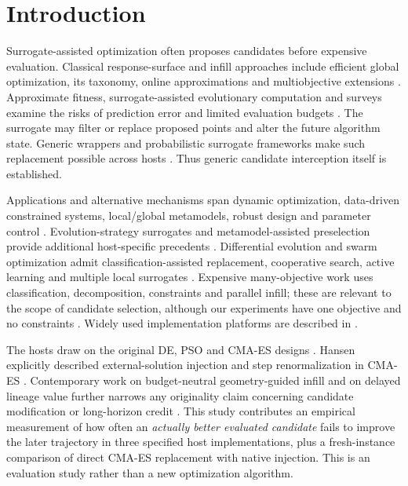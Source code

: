 \documentclass[10pt,letterpaper]{article}
\begin{document}
\clearpage
{}
\linenumbers

\section*{Introduction}
Surrogate-assisted optimization often proposes candidates before expensive evaluation. Classical response-surface and infill approaches include efficient global optimization, its taxonomy, online approximations and multiobjective extensions \cite{jones1998ego,jones2001,knowles2006,zhang2010}. Approximate fitness, surrogate-assisted evolutionary computation and surveys examine the risks of prediction error and limited evaluation budgets \cite{jin2002,jin2011survey,haftka2016,stork2020}. The surrogate may filter or replace proposed points and alter the future algorithm state. Generic wrappers and probabilistic surrogate frameworks make such replacement possible across hosts \cite{ong2003,lim2010,cai2020,blank2021psaf,gpsaf2022}. Thus generic candidate interception itself is established.

Applications and alternative mechanisms span dynamic optimization, data-driven constrained systems, local/global metamodels, robust design and parameter control \cite{luo2019,wang2020forest,zhou2007,ong2006,bagheri2017}. Evolution-strategy surrogates and metamodel-assisted preselection provide additional host-specific precedents \cite{emmerich2002,hansen2019surrogate}. Differential evolution and swarm optimization admit classification-assisted replacement, cooperative search, active learning and multiple local surrogates \cite{lu2011,wang2019de,sun2017pso,lv2019,wang2017committee,li2021}. Expensive many-objective work uses classification, decomposition, constraints and parallel infill; these are relevant to the scope of candidate selection, although our experiments have one objective and no constraints \cite{habib2019,pan2019,deb2019taxonomy,viana2010,beaucaire2019,berveglieri2020,bagheri2017constraint}. Widely used implementation platforms are described in \cite{blank2020pymoo,tian2017}.

The hosts draw on the original DE, PSO and CMA-ES designs \cite{storn1997,kennedy1995,hansen2001}. Hansen explicitly described external-solution injection and step renormalization in CMA-ES \cite{hansen2011inject}. Contemporary work on budget-neutral geometry-guided infill and on delayed lineage value further narrows any originality claim concerning candidate modification or long-horizon credit \cite{yu2026janus,siper2026}. This study contributes an empirical measurement of how often an \emph{actually better evaluated candidate} fails to improve the later trajectory in three specified host implementations, plus a fresh-instance comparison of direct CMA-ES replacement with native injection. This is an evaluation study rather than a new optimization algorithm.
\end{document}
